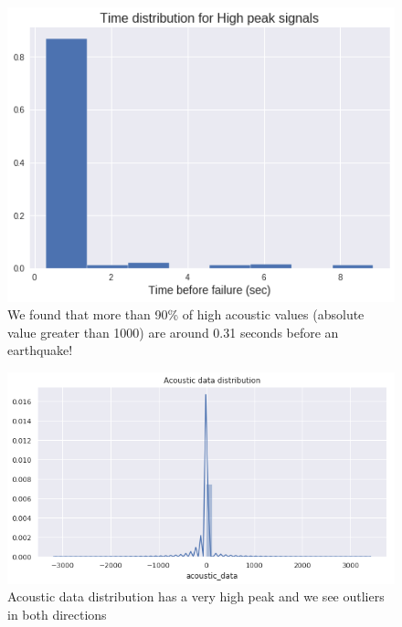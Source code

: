 \documentclass[]{llncs} %
\begin{document}
\begin{figure}[h!]
	\centering
	\includegraphics[width=01\linewidth]{timeDistribution}
	\caption{We found that more than 90\% of high acoustic values (absolute value greater than 1000) are around 0.31 seconds before an earthquake!}
	\label{fig:timeDistribution}
\end{figure}

\begin{figure}[h!]
	\centering
	\includegraphics[width=01\linewidth]{acousticDataDistribution}
	\caption{Acoustic data distribution has a very high peak and we see outliers in both directions}
	\label{fig:acousticDataDistribution}
\end{figure}
\end{document}
